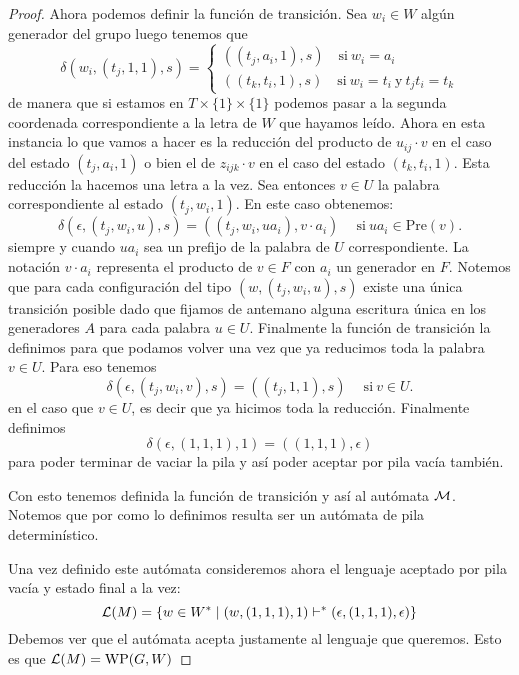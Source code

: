 \documentclass[tesis.tex]{subfiles}
\begin{document}
\begin{proof}
	Ahora podemos definir la función de transición. 
	Sea $w_i \in W$ algún generador del grupo luego tenemos que
	\[
	\delta(w_i,(t_j,1,1), s) =
		\begin{cases}
		 ((t_j,a_i,1), s) \quad \text{si} \ w_{i}=a_{i} \\
		 ((t_k,t_i,1), s) \quad \text{si} \ w_{i}=t_{i} \ \text{y} \ t_{j}t_{i} = t_{k}
	\end{cases}\]
	de manera que si estamos en $T \times \{ 1 \} \times \{ 1 \}$ podemos pasar a la segunda coordenada correspondiente a la letra de $W$ que hayamos leído.	
	Ahora en esta instancia lo que vamos a hacer es la reducción del producto de $u_{ij} \cdot v$ en el caso del estado $(t_j,a_i,1)$ o bien el de $z_{ijk} \cdot v$ en el caso del estado $(t_k,t_i,1)$.
	Esta reducción la hacemos una letra a la vez.
	Sea entonces $v \in U$ la palabra correspondiente al estado $(t_{j},w_{i},1)$.
	En este caso obtenemos:
	\begin{equation*}
		\delta(\epsilon,(t_j,w_i,u), s) = ((t_j,w_i,u a_i), v \cdot a_i ) \quad \ \text{si} \ ua_{i} \in \text{Pre}(v).
	\end{equation*}
	siempre y cuando $ua_i$ sea un prefijo de la palabra de $U$ correspondiente.
	La notación $v \cdot a_{i}$ representa el producto de $v \in F$ con $a_{i}$ un generador en $F$.
	Notemos que para cada configuración del tipo $(w,(t_{j}, w_{i}, u),s)$ existe una única transición posible dado que fijamos de antemano alguna escritura única en los generadores $A$ para cada palabra $u \in U$.
	Finalmente la función de transición la definimos para que podamos volver una vez que ya reducimos toda la palabra $v \in U$.
	Para eso tenemos 
	\begin{equation*}
		\delta(\epsilon,(t_j,w_i,v), s) = ((t_j,1,1), s) \quad \ \text{si} \ v \in U.		
	\end{equation*}
	en el caso que $v \in U$, es decir que ya hicimos toda la reducción.
	Finalmente definimos 
	\[
		\delta (\epsilon, (1,1,1), 1) = ((1,1,1), \epsilon)
	\]
	para poder terminar de vaciar la pila y así poder aceptar por pila vacía también.
	
	Con esto tenemos definida la función de transición y así al autómata $\cal M$. 
	Notemos que por como lo definimos resulta ser un autómata de pila determinístico.
		
	Una vez definido este autómata consideremos ahora el lenguaje aceptado por pila vacía y estado final a la vez:
	\[
	{\cal L }(M) = \{  w \in W^* \mid (w,(1,1,1),1)   \vdash^*  (\epsilon, (1,1,1), \epsilon)  \}
	\]
	Debemos ver que el autómata acepta justamente al lenguaje que queremos. 
	Esto es que $ {\cal L }(M) = \text{WP}(G,W) $ 
	

\end{proof}
\end{document}
